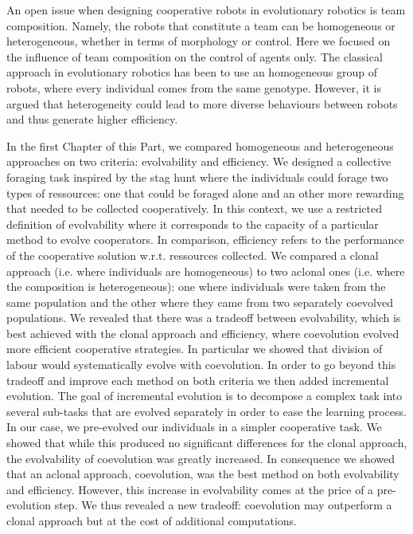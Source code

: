 		An open issue when designing cooperative robots in evolutionary robotics is team composition. Namely, the robots that constitute a team can be homogeneous or heterogeneous, whether in terms of morphology or control. Here we focused on the influence of team composition on the control of agents only. The classical approach in evolutionary robotics has been to use an homogeneous group of robots, where every individual comes from the same genotype. However, it is argued that heterogeneity could lead to more diverse behaviours between robots and thus generate higher efficiency.

		In the first Chapter of this Part, we compared homogeneous and heterogeneous approaches on two criteria: evolvability and efficiency. We designed a collective foraging task inspired by the stag hunt where the individuals could forage two types of ressources: one that could be foraged alone and an other more rewarding that needed to be collected cooperatively. In this context, we use a restricted definition of evolvability where it corresponds to the capacity of a particular method to evolve cooperators. In comparison, efficiency refers to the performance of the cooperative solution w.r.t. ressources collected. We compared a clonal approach (i.e. where individuals are homogeneous) to two aclonal ones (i.e. where the composition is heterogeneous): one where individuals were taken from the same population and the other where they came from two separately coevolved populations. We revealed that there was a tradeoff between evolvability, which is best achieved with the clonal approach and efficiency, where coevolution evolved more efficient cooperative strategies. In particular we showed that division of labour would systematically evolve with coevolution. In order to go beyond this tradeoff and improve each method on both criteria we then added incremental evolution. The goal of incremental evolution is to decompose a complex task into several sub-tasks that are evolved separately in order to ease the learning process. In our case, we pre-evolved our individuals in a simpler cooperative task. We showed that while this produced no significant differences for the clonal approach, the evolvability of coevolution was greatly increased. In consequence we showed that an aclonal approach, coevolution, was the best method on both evolvability and efficiency. However, this increase in evolvability comes at the price of a pre-evolution step. We thus revealed a new tradeoff: coevolution may outperform a clonal approach but at the cost of additional computations.

